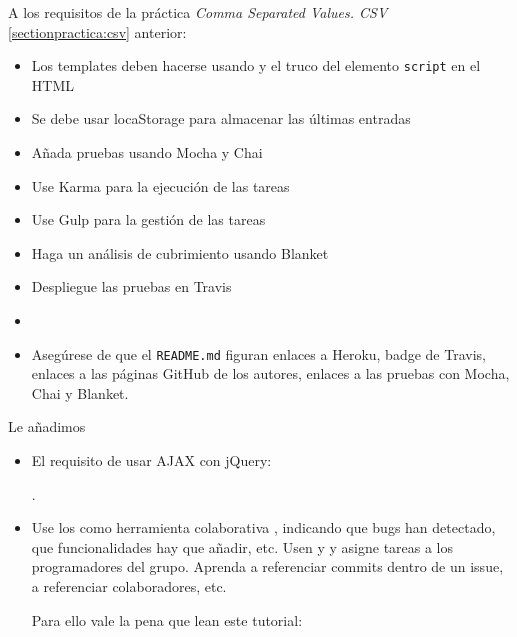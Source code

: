\label{sectionpractica:csvajax}





A los requisitos de la práctica {\it Comma Separated Values. CSV} \ref{sectionpractica:csv}
anterior:
\begin{itemize}
\item
Los templates deben hacerse usando  y el truco del elemento \verb|script| en el HTML
\item
Se debe usar locaStorage para almacenar las últimas entradas
\item
Añada pruebas usando Mocha y Chai
\item
Use Karma para la ejecución de las tareas
\item
Use Gulp para la gestión de las tareas 
\item
Haga un análisis de cubrimiento usando Blanket
\item
Despliegue las pruebas en Travis
\item
{}
\item
Asegúrese de que el \verb|README.md| figuran enlaces a Heroku, badge de Travis, enlaces a las páginas GitHub de los autores, enlaces a las pruebas con Mocha, Chai y Blanket.
\end{itemize}
Le añadimos 
\begin{itemize}
\item
El requisito de usar AJAX con jQuery:

.

\item
Use los  como herramienta colaborativa , indicando
que bugs han detectado, que funcionalidades hay que añadir, etc.
Usen  y  y asigne tareas a los
programadores del
grupo. Aprenda a referenciar commits dentro de un issue, a referenciar colaboradores, etc.

Para ello vale la pena que lean este tutorial:
\end{itemize}

